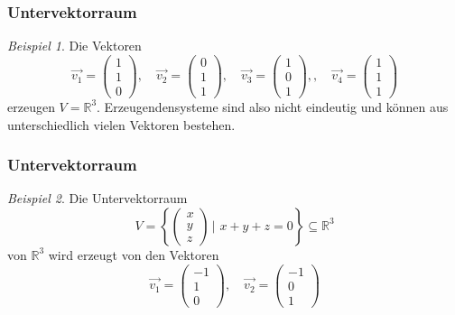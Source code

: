 \documentclass[hyperref={pdfpagelabels=false}]{beamer}
\theoremstyle{plain}%
\theoremstyle{definition}
\theoremstyle{remark}
\newtheorem*{beispiel}{Beispiel}
\def \R{\mathbb R}
\newcommand{\vektor}[1]{\overrightarrow{#1}}
\begin{document}
\begin{frame}
\frametitle{Untervektorraum}

\begin{beispiel} Die Vektoren  
	$$\vektor{v_1} = \left( \begin{matrix} 1 \\ 1 \\ 0 \end{matrix} \right), \quad 
	\vektor{v_2} = \left( \begin{matrix} 0 \\ 1 \\  1 \end{matrix} \right), \quad  
	\vektor{v_3} = \left( \begin{matrix} 1 \\ 0 \\ 1 \end{matrix} \right), , \quad  
	\vektor{v_4} = \left( \begin{matrix} 1 \\ 1 \\ 1 \end{matrix} \right)  $$ 
erzeugen $V = \mathbb R^3$. \pause Erzeugendensysteme sind also nicht eindeutig und können aus 
unterschiedlich vielen Vektoren bestehen. 
\end{beispiel}

\end{frame}

\begin{frame}
\frametitle{Untervektorraum}

\begin{beispiel} Die Untervektorraum
	$$ V  = \left\{ \begin{pmatrix} x \\ y \\ z \end{pmatrix} \,\vert \,\, x + y + z = 0 \right\} \subseteq \R^3 $$
von $\R^3$ wird erzeugt von den Vektoren 
	$$\vektor{v_1} = \left( \begin{matrix} -1 \\ 1 \\  0 \end{matrix} \right), \quad 
	\vektor{v_2} = \left( \begin{matrix} -1 \\ 0 \\  1 \end{matrix} \right) $$ 
\end{beispiel}

\end{frame}
\end{document}
